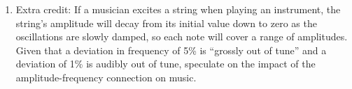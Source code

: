\documentclass[12pt]{article}
\begin{document}
\begin{enumerate}
\item{Extra credit: If a musician excites a string when playing an instrument, the string's amplitude will decay from its initial value down to zero as the oscillations are slowly damped, so each note will cover a range of amplitudes. 
Given that a deviation in frequency of 5\% is ``grossly out of tune'' and a deviation of 1\% is audibly out of tune, speculate on the impact of the amplitude-frequency connection on music.}
 \end{enumerate}
\end{document}
